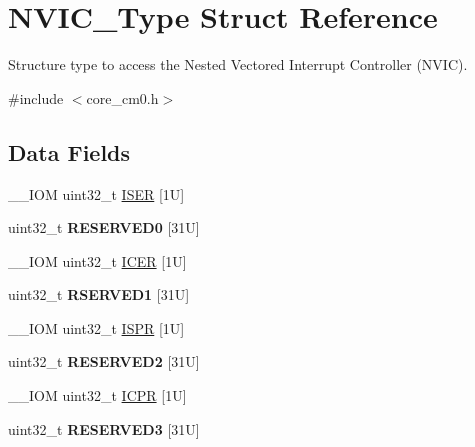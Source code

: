 \hypertarget{struct_n_v_i_c___type}{}\section{N\+V\+I\+C\+\_\+\+Type Struct Reference}
\label{struct_n_v_i_c___type}


Structure type to access the Nested Vectored Interrupt Controller (N\+V\+IC).  




{\ttfamily \#include $<$core\+\_\+cm0.\+h$>$}

\subsection*{Data Fields}
\begin{DoxyCompactItemize}
\item 
\+\_\+\+\_\+\+I\+OM uint32\+\_\+t \hyperlink{struct_n_v_i_c___type_a1f970af55366c7caaf51407309f304db}{I\+S\+ER} \mbox{[}1\+U\mbox{]}
\item 
\mbox{\label{struct_n_v_i_c___type_a99ed1d1bbc9e85b465fb29f40f37aa3a}} 
uint32\+\_\+t {\bfseries R\+E\+S\+E\+R\+V\+E\+D0} \mbox{[}31\+U\mbox{]}
\item 
\+\_\+\+\_\+\+I\+OM uint32\+\_\+t \hyperlink{struct_n_v_i_c___type_a3617ee583e4154c0a5901c6965020da9}{I\+C\+ER} \mbox{[}1\+U\mbox{]}
\item 
\mbox{\label{struct_n_v_i_c___type_aea9a4f17e5fa16fa35ba48cc9f27434b}} 
uint32\+\_\+t {\bfseries R\+S\+E\+R\+V\+E\+D1} \mbox{[}31\+U\mbox{]}
\item 
\+\_\+\+\_\+\+I\+OM uint32\+\_\+t \hyperlink{struct_n_v_i_c___type_aecb96022a2971ea637c06798bd131e91}{I\+S\+PR} \mbox{[}1\+U\mbox{]}
\item 
\mbox{\label{struct_n_v_i_c___type_ad31fe99d09ec7629b716f06af05d0a54}} 
uint32\+\_\+t {\bfseries R\+E\+S\+E\+R\+V\+E\+D2} \mbox{[}31\+U\mbox{]}
\item 
\+\_\+\+\_\+\+I\+OM uint32\+\_\+t \hyperlink{struct_n_v_i_c___type_a4d45961e44d2663447bbf0111755c0e7}{I\+C\+PR} \mbox{[}1\+U\mbox{]}
\item 
\mbox{\label{struct_n_v_i_c___type_a97d3441cfdde21959e8acbbdc358b99f}} 
uint32\+\_\+t {\bfseries R\+E\+S\+E\+R\+V\+E\+D3} \mbox{[}31\+U\mbox{]}

\end{DoxyCompactItemize}
